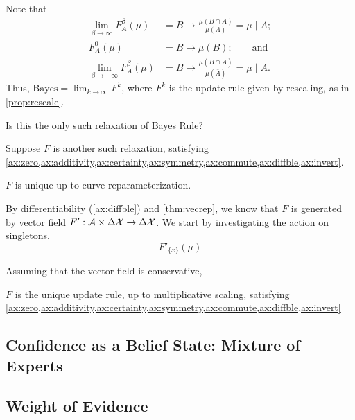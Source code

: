 \documentclass{article}
\begin{document}
Note that
\begin{align*}
\lim_{\beta\to\infty} F^\beta_A(\mu) &= B \mapsto \frac{\mu(B \cap A)}{\mu(A)}
   = \mu \mid A; \\
 F^0_A(\mu) &= B \mapsto \mu(B); \qquad\text{and}\\
\lim_{\beta\to-\infty} F^\beta_A(\mu) &= B \mapsto \frac{\mu(B \cap \bar A)}{\mu(\bar A)}
	  = \mu \mid \bar A.
\end{align*}
Thus, $\mathrm{Bayes} = \lim_{k \to \infty} F^{k}$, where $F^k$ is the update rule given by rescaling, as in \cref{prop:rescale}.



\begin{wip}
Is this the only such relaxation of Bayes Rule?

Suppose $F$ is another such relaxation, satisfying \cref{ax:zero,ax:additivity,ax:certainty,ax:symmetry,ax:commute,ax:diffble,ax:invert}.

\begin{prop}
	$F$ is unique up to curve reparameterization.
\end{prop}

By differentiability (\cref{ax:diffble}) and \cref{thm:vecrep}, we know that $F$ is generated by vector field $F' : \mathcal A \times \Delta\mathcal X \to \Delta\mathcal X$.
We start by investigating the action on singletons.
\[
	F'_{\{x\}}(\mu)
\]

Assuming that the vector field is conservative,

\begin{conj}
	$F$ is the unique update rule, up to multiplicative scaling, satisfying
	\cref{ax:zero,ax:additivity,ax:certainty,ax:symmetry,ax:commute,ax:diffble,ax:invert}
\end{conj}
\end{wip}


\subsection{Confidence as a Belief State: Mixture of Experts}

\subsection{Weight of Evidence}
\end{document}
